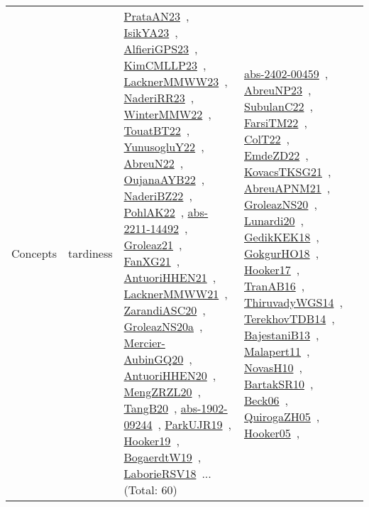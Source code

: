 {\begin{longtable}{lp{3cm}>{\raggedright\arraybackslash}p{6cm}>{\raggedright\arraybackslash}p{6cm}>{\raggedright\arraybackslash}p{8cm}}
Concepts & tardiness & \href{works/PrataAN23.pdf}{PrataAN23}~\cite{PrataAN23}, \href{works/IsikYA23.pdf}{IsikYA23}~\cite{IsikYA23}, \href{works/AlfieriGPS23.pdf}{AlfieriGPS23}~\cite{AlfieriGPS23}, \href{works/KimCMLLP23.pdf}{KimCMLLP23}~\cite{KimCMLLP23}, \href{works/LacknerMMWW23.pdf}{LacknerMMWW23}~\cite{LacknerMMWW23}, \href{works/NaderiRR23.pdf}{NaderiRR23}~\cite{NaderiRR23}, \href{works/WinterMMW22.pdf}{WinterMMW22}~\cite{WinterMMW22}, \href{works/TouatBT22.pdf}{TouatBT22}~\cite{TouatBT22}, \href{works/YunusogluY22.pdf}{YunusogluY22}~\cite{YunusogluY22}, \href{works/AbreuN22.pdf}{AbreuN22}~\cite{AbreuN22}, \href{works/OujanaAYB22.pdf}{OujanaAYB22}~\cite{OujanaAYB22}, \href{works/NaderiBZ22.pdf}{NaderiBZ22}~\cite{NaderiBZ22}, \href{works/PohlAK22.pdf}{PohlAK22}~\cite{PohlAK22}, \href{works/abs-2211-14492.pdf}{abs-2211-14492}~\cite{abs-2211-14492}, \href{works/Groleaz21.pdf}{Groleaz21}~\cite{Groleaz21}, \href{works/FanXG21.pdf}{FanXG21}~\cite{FanXG21}, \href{works/AntuoriHHEN21.pdf}{AntuoriHHEN21}~\cite{AntuoriHHEN21}, \href{works/LacknerMMWW21.pdf}{LacknerMMWW21}~\cite{LacknerMMWW21}, \href{works/ZarandiASC20.pdf}{ZarandiASC20}~\cite{ZarandiASC20}, \href{works/GroleazNS20a.pdf}{GroleazNS20a}~\cite{GroleazNS20a}, \href{works/Mercier-AubinGQ20.pdf}{Mercier-AubinGQ20}~\cite{Mercier-AubinGQ20}, \href{works/AntuoriHHEN20.pdf}{AntuoriHHEN20}~\cite{AntuoriHHEN20}, \href{works/MengZRZL20.pdf}{MengZRZL20}~\cite{MengZRZL20}, \href{works/TangB20.pdf}{TangB20}~\cite{TangB20}, \href{works/abs-1902-09244.pdf}{abs-1902-09244}~\cite{abs-1902-09244}, \href{works/ParkUJR19.pdf}{ParkUJR19}~\cite{ParkUJR19}, \href{works/Hooker19.pdf}{Hooker19}~\cite{Hooker19}, \href{works/BogaerdtW19.pdf}{BogaerdtW19}~\cite{BogaerdtW19}, \href{works/LaborieRSV18.pdf}{LaborieRSV18}~\cite{LaborieRSV18}... (Total: 60) & \href{works/abs-2402-00459.pdf}{abs-2402-00459}~\cite{abs-2402-00459}, \href{works/AbreuNP23.pdf}{AbreuNP23}~\cite{AbreuNP23}, \href{works/SubulanC22.pdf}{SubulanC22}~\cite{SubulanC22}, \href{works/FarsiTM22.pdf}{FarsiTM22}~\cite{FarsiTM22}, \href{works/ColT22.pdf}{ColT22}~\cite{ColT22}, \href{works/EmdeZD22.pdf}{EmdeZD22}~\cite{EmdeZD22}, \href{works/KovacsTKSG21.pdf}{KovacsTKSG21}~\cite{KovacsTKSG21}, \href{works/AbreuAPNM21.pdf}{AbreuAPNM21}~\cite{AbreuAPNM21}, \href{works/GroleazNS20.pdf}{GroleazNS20}~\cite{GroleazNS20}, \href{works/Lunardi20.pdf}{Lunardi20}~\cite{Lunardi20}, \href{works/GedikKEK18.pdf}{GedikKEK18}~\cite{GedikKEK18}, \href{works/GokgurHO18.pdf}{GokgurHO18}~\cite{GokgurHO18}, \href{works/Hooker17.pdf}{Hooker17}~\cite{Hooker17}, \href{works/TranAB16.pdf}{TranAB16}~\cite{TranAB16}, \href{works/ThiruvadyWGS14.pdf}{ThiruvadyWGS14}~\cite{ThiruvadyWGS14}, \href{works/TerekhovTDB14.pdf}{TerekhovTDB14}~\cite{TerekhovTDB14}, \href{works/BajestaniB13.pdf}{BajestaniB13}~\cite{BajestaniB13}, \href{works/Malapert11.pdf}{Malapert11}~\cite{Malapert11}, \href{works/NovasH10.pdf}{NovasH10}~\cite{NovasH10}, \href{works/BartakSR10.pdf}{BartakSR10}~\cite{BartakSR10}, \href{works/Beck06.pdf}{Beck06}~\cite{Beck06}, \href{works/QuirogaZH05.pdf}{QuirogaZH05}~\cite{QuirogaZH05}, \href{works/Hooker05.pdf}{Hooker05}~\cite{Hooker05}, 
\end{longtable}}
